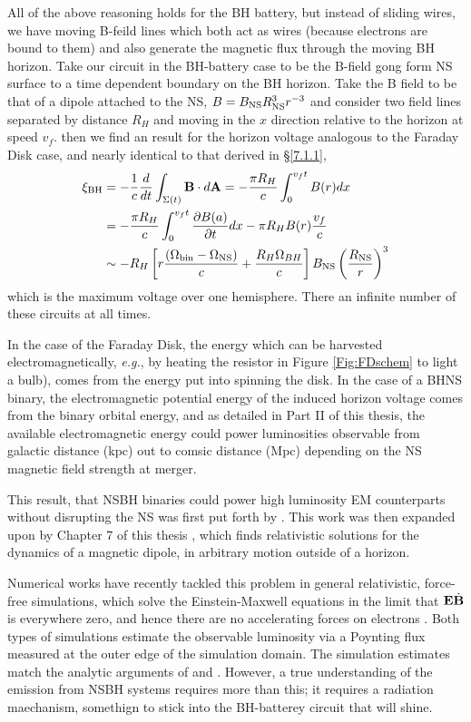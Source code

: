 All of the above reasoning holds for the BH battery, but instead of sliding
wires, we have moving B-feild lines which both act as wires (because electrons
are bound to them) and also generate the magnetic flux through the moving BH
horizon. Take our circuit in the BH-battery case to be the B-field gong form NS surface to a time dependent boundary on the BH horizon. Take the B field to be
that of a dipole attached to the NS, $B = B_{\rm NS} R^3_{\rm NS} r^{-3}$ and
consider two field lines separated by distance $R_H$ and moving in the $x$
direction relative to the horizon at speed $v_f$. then we find an result for
the horizon voltage analogous to the Faraday Disk case, and nearly identical
to that derived in \S \ref{7.1.1},
\begin{align}
\xi_{\rm BH} &= - \frac{1}{c}\frac{d}{dt} \int_{\Sigma(t)}{{\bf B} \cdot d{\bf A}} =  - \frac{\pi R_H}{c} \int^{v_f t}_{0} {B(r) dx}  \\
&=  - \frac{\pi R_H}{c}  \int^{v_f t}_{0}{ \frac{\partial B(a)}{\partial t} dx}  - \pi R_H B(r) \frac{v_f}{c}    \\
& \sim    -R_H \left[r \frac{\left(\Omega_{\rm bin}  - \Omega_{\rm NS}\right)}{c} + \frac{R_H\Omega_{BH}}{c}\right] B_{\rm NS}  \left( \frac{R_{\rm NS}}{r} \right)^3
\end{align}
which is the maximum voltage over one hemisphere. There an infinite number of these circuits at all times. 

In the case of the Faraday Disk, the energy which can be harvested
electromagnetically, \emph{e.g.}, by heating the resistor in Figure
\ref{Fig:FDschem} to light a bulb), comes from the energy put into spinning
the disk. In the case of a BHNS binary, the electromagnetic potential energy
of the induced horizon voltage comes from the binary orbital energy, and as
detailed in Part II of this thesis, the available electromagnetic energy could
power luminosities observable from galactic distance (kpc) out to comsic
distance (Mpc) depending on the NS magnetic field strength at merger.


This result, that NSBH binaries could power high luminosity EM counterparts
without disrupting the NS was first put forth by
\cite[ML11][]{McWilliamsLevin:2011}. This work was then expanded upon by
Chapter 7 of this thesis \cite{D'OrazioLevin:2013}, which finds relativistic
solutions for the dynamics of a magnetic dipole, in arbitrary motion outside
of a horizon. 

Numerical works have recently tackled this problem in general relativistic,
force-free simulations, which solve the Einstein-Maxwell equations in the
limit that ${\bf E} \dot {{\bf B}}$ is everywhere zero, and hence there are no
accelerating forces on electrons \citep{ShapiroNSBH:2013}. Both types of
simulations estimate the observable luminosity via a Poynting flux measured at
the outer edge of the simulation domain. The simulation estimates match the
analytic arguments of \cite{McWilliamsLevin:2011} and
\cite{D'OrazioLevin:2013}. However, a true understanding of the emission from
NSBH systems requires more than this; it requires a radiation maechanism, somethign to stick into the BH-batterey circuit that will shine.

